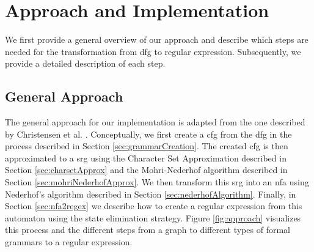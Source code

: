 \chapter{Approach and Implementation}
\label{chapter:Approach}


We first provide a general overview of our approach and describe which steps are needed for the transformation from \ac{dfg} to regular expression. Subsequently, we provide a detailed description of each step.


\section{General Approach}

The general approach for our implementation is adapted from the one described by Christensen et al. \cite{brics}. Conceptually, we first create a \acf{cfg} from the \ac{dfg} in the process described in Section \ref{sec:grammarCreation}.
The created \ac{cfg} is then approximated to a \acf{srg} using the Character Set Approximation described in Section \ref{sec:charsetApprox} and the Mohri-Nederhof algorithm described in Section \ref{sec:mohriNederhofApprox}. We then transform this \ac{srg} into an \acf{nfa} using Nederhof's algorithm described in Section \ref{sec:nederhofAlgorithm}. Finally, in Section \ref{sec:nfa2regex} we describe how to create a regular expression from this automaton using the state elimination strategy. Figure \ref{fig:approach} visualizes this process and the different steps from a graph to different types of formal grammars to a regular expression.


